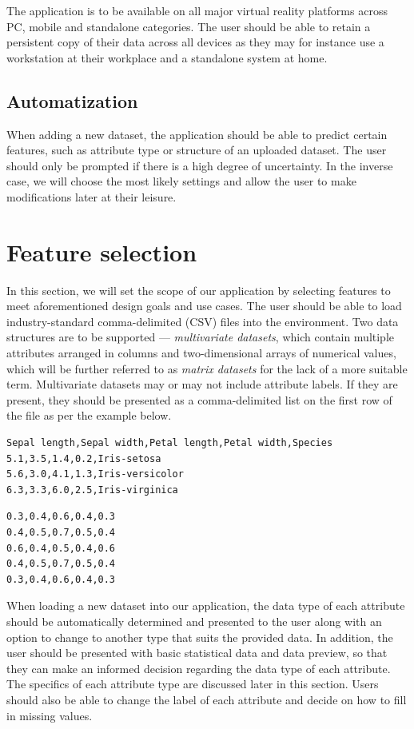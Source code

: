 \documentclass[thesis=M,english,hidelinks]{FITthesisXE}[2012/06/26]
\begin{document}
The application is to be available on all major virtual reality platforms across PC, mobile and standalone categories. The user should be able to retain a persistent copy of their data across all devices as they may for instance use a workstation at their workplace and a standalone system at home.

\subsection{Automatization}

When adding a new dataset, the application should be able to predict certain features, such as attribute type or structure of an uploaded dataset. The user should only be prompted if there is a high degree of uncertainty. In the inverse case, we will choose the most likely settings and allow the user to make modifications later at their leisure.

\section{Feature selection}

In this section, we will set the scope of our application by selecting features to meet aforementioned design goals and use cases. The user should be able to load industry-standard comma-delimited (CSV) files into the environment. Two data structures are to be supported --- \emph{multivariate datasets}, which contain multiple attributes arranged in columns and two-dimensional arrays of numerical values, which will be further referred to as \emph{matrix datasets} for the lack of a more suitable term. Multivariate datasets may or may not include attribute labels. If they are present, they should be presented as a comma-delimited list on the first row of the file as per the example below.

\begin{lstlisting}
Sepal length,Sepal width,Petal length,Petal width,Species 
5.1,3.5,1.4,0.2,Iris-setosa
5.6,3.0,4.1,1.3,Iris-versicolor
6.3,3.3,6.0,2.5,Iris-virginica
\end{lstlisting}

\begin{lstlisting}
0.3,0.4,0.6,0.4,0.3
0.4,0.5,0.7,0.5,0.4
0.6,0.4,0.5,0.4,0.6
0.4,0.5,0.7,0.5,0.4
0.3,0.4,0.6,0.4,0.3
\end{lstlisting}

When loading a new dataset into our application, the data type of each attribute should be automatically determined and presented to the user along with an option to change to another type that suits the provided data. In addition, the user should be presented with basic statistical data and data preview, so that they can make an informed decision regarding the data type of each attribute. The specifics of each attribute type are discussed later in this section. Users should also be able to change the label of each attribute and decide on how to fill in missing values.
\end{document}
